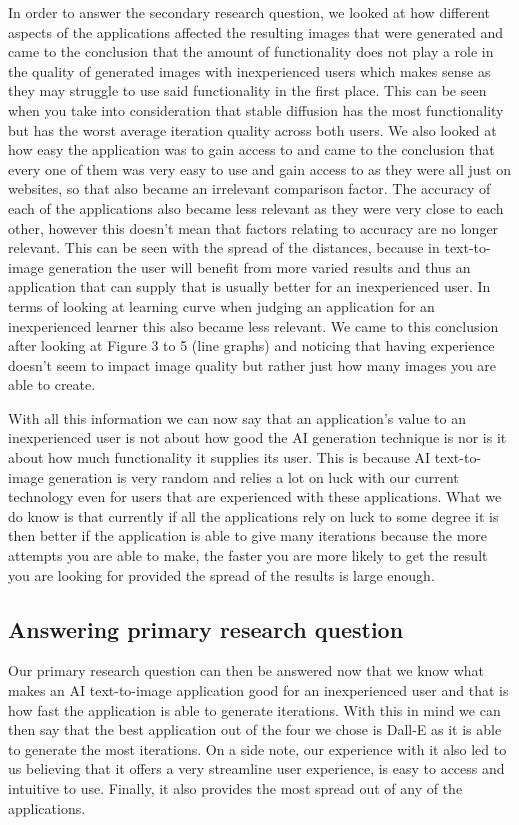 \documentclass[]{report}
\begin{document}
	In order to answer the secondary research question, we looked at how different aspects of the applications affected the resulting images that were generated and came to the conclusion that the amount of functionality does not play a role in the quality of generated images with inexperienced users which makes sense as they may struggle to use said functionality in the first place. This can be seen when you take into consideration that stable diffusion has the most functionality but has the worst average iteration quality across both users. 
	We also looked at how easy the application was to gain access to and came to the conclusion that every one of them was very easy to use and gain access to as they were all just on websites, so that also became an irrelevant comparison factor.
	The accuracy of each of the applications also became less relevant as they were very close to each other, however this doesn't mean that factors relating to accuracy are no longer relevant. This can be seen with the spread of the distances, because in text-to-image generation the user will benefit from more varied results and thus an application that can supply that is usually better for an inexperienced user.
	In terms of looking at learning curve when judging an application for an inexperienced learner this also became less relevant. We came to this conclusion after looking at Figure 3 to 5 (line graphs) and noticing that having experience doesn't seem to impact image quality but rather just how many images you are able to create.
	
	
	With all this information we can now say that an application's value to an inexperienced user is not about how good the AI generation technique is nor is it about how much functionality it supplies its user. This is because AI text-to-image generation is very random and relies a lot on luck with our current technology even for users that are experienced with these applications. What we do know is that currently if all the applications rely on luck to some degree it is then better if the application is able to give many iterations because the more attempts you are able to make, the faster you are more likely to get the result you are looking for provided the spread of the results is large enough. 
	
	\subsection{Answering primary research question}
	
	Our primary research question can then be answered now that we know what makes an AI text-to-image application good for an inexperienced user and that is how fast the application is able to generate iterations. With this in mind we can then say that the best application out of the four we chose is Dall-E as it is able to generate the most iterations. On a side note, our experience with it also led to us believing that it offers a very streamline user experience, is easy to access and intuitive to use. Finally, it also provides the most spread out of any of the applications.
	
\end{document}
